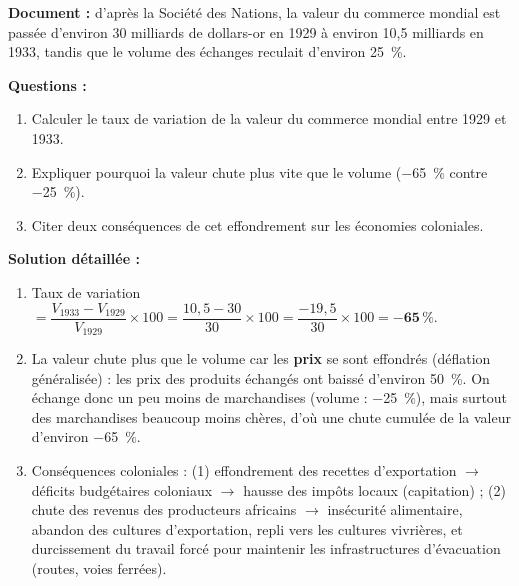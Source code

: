 \documentclass[11pt]{article}
\begin{document}
\begin{exoresolu}
\textbf{Document :} d'après la Société des Nations, la valeur du commerce mondial est passée d'environ 30 milliards de dollars-or en 1929 à environ 10,5 milliards en 1933, tandis que le volume des échanges reculait d'environ \SI{25}{\%}.

\textbf{Questions :}
\begin{enumerate}
    \item Calculer le taux de variation de la valeur du commerce mondial entre 1929 et 1933.
    \item Expliquer pourquoi la valeur chute plus vite que le volume (\SI{-65}{\%} contre \SI{-25}{\%}).
    \item Citer deux conséquences de cet effondrement sur les économies coloniales.
\end{enumerate}

\tcblower

\textbf{Solution détaillée :}
\begin{enumerate}
    \item Taux de variation $= \dfrac{V_{1933} - V_{1929}}{V_{1929}} \times 100 = \dfrac{10,5 - 30}{30} \times 100 = \dfrac{-19,5}{30} \times 100 = \mathbf{-65\,\%}$.
    \item La valeur chute plus que le volume car les \textbf{prix} se sont effondrés (déflation généralisée) : les prix des produits échangés ont baissé d'environ \SI{50}{\%}. On échange donc un peu moins de marchandises (volume : \SI{-25}{\%}), mais surtout des marchandises beaucoup moins chères, d'où une chute cumulée de la valeur d'environ \SI{-65}{\%}.
    \item Conséquences coloniales : (1) effondrement des recettes d'exportation $\to$ déficits budgétaires coloniaux $\to$ hausse des impôts locaux (capitation) ; (2) chute des revenus des producteurs africains $\to$ insécurité alimentaire, abandon des cultures d'exportation, repli vers les cultures vivrières, et durcissement du travail forcé pour maintenir les infrastructures d'évacuation (routes, voies ferrées).
\end{enumerate}
\end{exoresolu}
\end{document}

